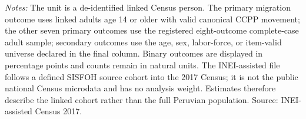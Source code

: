 \begin{minipage}{0.98\linewidth}\footnotesize\textit{Notes:} The unit is a de-identified linked Census person. The primary migration outcome uses linked adults age 14 or older with valid canonical CCPP movement; the other seven primary outcomes use the registered eight-outcome complete-case adult sample; secondary outcomes use the age, sex, labor-force, or item-valid universe declared in the final column. Binary outcomes are displayed in percentage points and counts remain in natural units. The INEI-assisted file follows a defined SISFOH source cohort into the 2017 Census; it is not the public national Census microdata and has no analysis weight. Estimates therefore describe the linked cohort rather than the full Peruvian population. Source: INEI-assisted Census 2017.\end{minipage}
\endgroup
